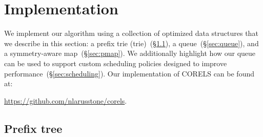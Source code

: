 

\section{Implementation}
\label{sec:implementation}

We implement our algorithm using a collection of optimized data structures
that we describe in this section:
a prefix trie (trie)~(\S\ref{sec:trie}), a queue~(\S\ref{sec:queue}),
and a symmetry-aware map~(\S\ref{sec:pmap}).
%
We additionally highlight how our queue can be used to support
custom scheduling policies designed to improve performance~(\S\ref{sec:scheduling}).
%
Our implementation of CORELS can be found at: \\

\centerline{\url{https://github.com/nlarusstone/corels}.}

\subsection{Prefix tree}
\label{sec:trie}

